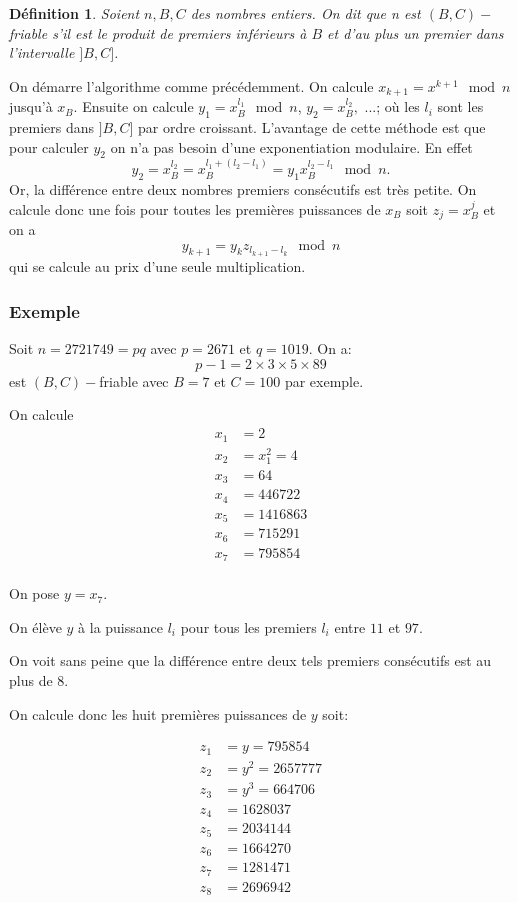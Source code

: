 \documentclass[french, 12pt, titlepage]{article}
\newtheorem{definition}{D{\'e}finition}
\begin{document}
\begin{definition}
  Soient $n, B, C$ des nombres entiers. On dit que n est $(B, C)-$friable s'il est le produit de premiers inférieurs à $B$ et d'au plus un premier dans l'intervalle $]B, C]$.
\end{definition}
On démarre l'algorithme comme précédemment. On calcule $x_{k + 1} = x^{k + 1} \mod n$ jusqu'à $x_B.$ Ensuite on calcule $y_1 = x_B^{l_1} \mod n$, $y_2 = x_B^{l_2},$ ...; où les $l_i$ sont les premiers dans $]B,C]$ par ordre croissant.
L'avantage de cette méthode est que pour calculer $y_2$ on n'a pas besoin d'une exponentiation modulaire. En effet \[ y_2 = x_B^{l_2} = x_B^{l_1 + (l_2 - l_1)} = y_1 x_B^{l_2 - l_1} \mod n.\]
Or, la différence entre deux nombres premiers consécutifs est très petite. On calcule donc une fois pour toutes les premières puissances de $x_B$ soit $z_j = x_B^j$ et on a \[ y_{k + 1} = y_k z_{l_{k+1} - l_k} \mod n \] qui se calcule au prix d'une seule multiplication.
\subsubsection{Exemple}

Soit $n = 2721749 = pq$ avec $p = 2671$ et $q = 1019$. On a: \[p - 1 = 2 \times 3 \times 5 \times 89\] est $(B, C)-$friable avec $B = 7$ et $C = 100$ par exemple.

On calcule
\begin{align*}
  x_1 &= 2 \\
  x_2 &= x_1^2 = 4\\
  x_3 &= 64\\
  x_4 &= 446722\\ 
  x_5 &= 1416863\\
  x_6 &= 715291 \\
  x_7 &= 795854 \\
\end{align*}

On pose $y = x_7$.

On élève $y$ à la puissance $l_i$ pour tous les premiers $l_i$ entre $11$ et $97$.

On voit sans peine que la différence entre deux tels premiers consécutifs est au plus de $8.$

On calcule donc les huit premières puissances de $y$ soit:

\begin{align*}
  z_1 &= y = 795854\\
  z_2 &= y^2 = 2657777\\
  z_3 &= y^3 = 664706\\
  z_4 &= 1628037\\
  z_5 &= 2034144\\
  z_6 &= 1664270\\
  z_7 &= 1281471\\
  z_8 &= 2696942\\
\end{align*}
\end{document}
